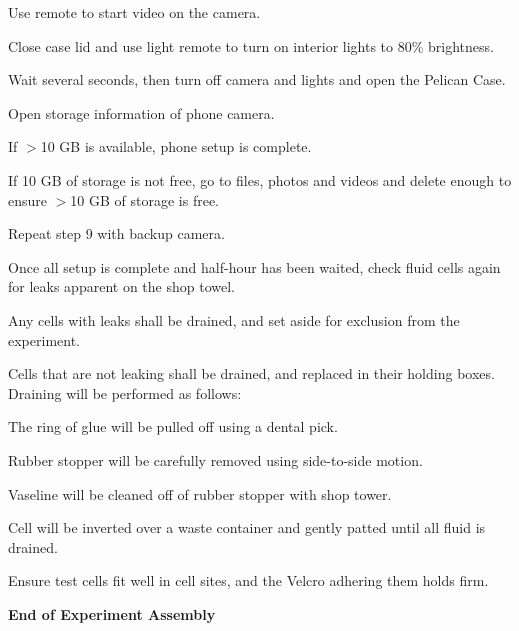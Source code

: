 \begin{checklist}
\begin{checklist}
        \item Use remote to start video on the camera.
        \item Close case lid and use light remote to turn on interior lights to 80\% brightness.
        \item Wait several seconds, then turn off camera and lights and open the Pelican Case.
    \end{checklist}
    \item Open storage information of phone camera.
    \begin{checklist}
        \item If $>$10 GB is available, phone setup is complete.
        \item If 10 GB of storage is not free, go to files, photos and videos and delete enough to ensure $>$10 GB of storage is free.
        \item Repeat step 9 with backup camera.
    \end{checklist}
    \item Once all setup is complete and half-hour has been waited, check fluid cells again for leaks apparent on the shop towel.
    \begin{checklist}
        \item Any cells with leaks shall be drained, and set aside for exclusion from the experiment.
        \item Cells that are not leaking shall be drained, and replaced in their holding boxes. Draining will be performed as follows:
        \begin{checklist}
            \item The ring of glue will be pulled off using a dental pick.
            \item Rubber stopper will be carefully removed using side-to-side motion.
            \item Vaseline will be cleaned off of rubber stopper with shop tower.
            \item Cell will be inverted over a waste container and gently patted until all fluid is drained.
        \end{checklist}
    \end{checklist}
    \item Ensure test cells fit well in cell sites, and the Velcro adhering them holds firm.
\end{checklist}
\textbf{End of Experiment Assembly}

\newpage{}
